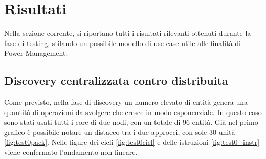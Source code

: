 \chapter{Risultati}%

Nella sezione corrente, si riportano tutti i risultati rilevanti ottenuti durante la fase di testing, stilando un possibile modello di use-case utile alle finalità di Power Management.
\section{Discovery centralizzata contro distribuita}
Come previsto, nella fase di discovery un numero elevato di entità genera una quantità di operazioni da svolgere che cresce in modo esponenziale. In questo caso sono stati usati tutti i core di due nodi, con un totale di 96 entità.
Già nel primo grafico è possibile notare un distacco tra i due approcci, con sole 30 unità \ref{fig:test0pack}. Nelle figure dei cicli \ref{fig:test0cicl} e delle istruzioni \ref{fig:test0_instr} viene confermato l'andamento non lineare.

